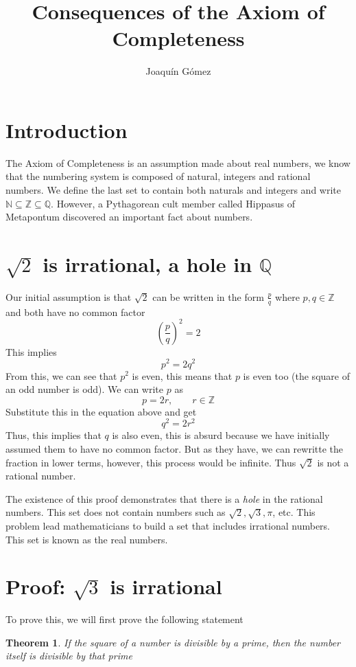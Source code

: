 \documentclass[a4paper,12pt]{article}
\title{Consequences of the Axiom of Completeness}
\author{Joaquín Gómez}
\newtheorem{theorem}{Theorem}
\begin{document}
\maketitle

\section{Introduction}
The Axiom of Completeness is an assumption made about real numbers, we know
that the numbering system is composed of natural, integers and rational
numbers. We define the last set to contain both naturals and integers and write
$\mathbb{N} \subseteq \mathbb{Z} \subseteq \mathbb{Q}$. However, a Pythagorean
cult member called Hippasus of Metapontum discovered an important fact about
numbers.

\section{$\sqrt{2}$ is irrational, a hole in $\mathbb{Q}$}

Our initial assumption is that $\sqrt 2$ can be written in the form $\frac p q$
where $p,q\in \mathbb{Z}$ and both have no common factor
\[
  {\left(\frac{p}{q}\right)}^2 = 2
\]
This implies
\[
  p^2 = 2q^2
\]
From this, we can see that $p^2$ is even, this means that $p$ is even too (the
square of an odd number is odd). We can write $p$ as
\[
  p=2r, \qquad r\in\mathbb{Z}
\]
Substitute this in the equation above and get
\[
  q^2=2r^2
\]
Thus, this implies that $q$ is also even, this is absurd because we have
initially assumed them to have no common factor. But as they have, we can
rewritte the fraction in lower terms, however, this process would be infinite.
Thus $\sqrt 2$ is not a rational number.

The existence of this proof demonstrates that there is a \textit{hole} in the
rational numbers. This set does not contain numbers such as $\sqrt 2, \sqrt 3,
  \pi$, etc. This problem lead mathematicians to build a set that includes
irrational numbers. This set is known as the real numbers.

\section{Proof: $\sqrt 3$ is irrational}

To prove this, we will first prove the following statement

\begin{theorem}
  If the square of a number is divisible by a prime, then the number itself is divisible by that prime
\end{theorem}
\end{document}
